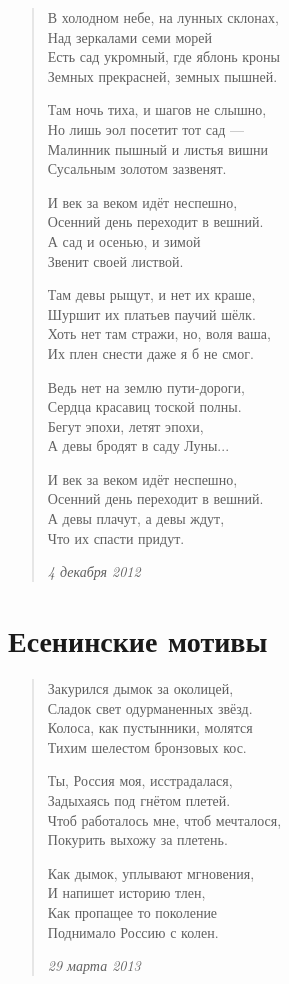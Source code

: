 \begin{verse}
В холодном небе, на лунных склонах,\\
Над зеркалами семи морей\\
Есть сад укромный, где яблонь кроны\\
Земных прекрасней, земных пышней.

Там ночь тиха, и шагов не слышно,\\
Но лишь эол посетит тот сад ---\\
Малинник пышный и листья вишни\\
Сусальным золотом зазвенят.

И век за веком идёт неспешно,\\
Осенний день переходит в вешний.\\
А сад и осенью, и зимой\\
Звенит своей листвой.

Там девы рыщут, и нет их краше,\\
Шуршит их платьев паучий шёлк.\\
Хоть нет там стражи, но, воля ваша,\\
Их плен снести даже я б не смог.

Ведь нет на землю пути-дороги,\\
Сердца красавиц тоской полны.\\
Бегут эпохи, летят эпохи,\\
А девы бродят в саду Луны...

И век за веком идёт неспешно,\\
Осенний день переходит в вешний.\\
А девы плачут, а девы ждут,\\
Что их спасти придут.

\emph{4 декабря 2012}
\end{verse}
\newpage

\section{Есенинские мотивы}

\begin{verse}
Закурился дымок за околицей,\\
Сладок свет одурманенных звёзд.\\
Колоса, как пустынники, молятся\\
Тихим шелестом бронзовых кос.

Ты, Россия моя, исстрадалася,\\
Задыхаясь под гнётом плетей.\\
Чтоб работалось мне, чтоб мечталося,\\
Покурить выхожу за плетень.

Как дымок, уплывают мгновения,\\
И напишет историю тлен,\\
Как пропащее то поколение\\
Поднимало Россию с колен.

\emph{29 марта 2013}
\end{verse}
\newpage

